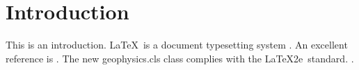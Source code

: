 \section{Introduction}

This is an introduction. \LaTeX\ is a  document
typesetting system \cite[]{lamport}. An excellent reference is
\cite[]{kopka}. The new \textsf{geophysics.cls} class complies with
the \LaTeX2e\ standard. .
